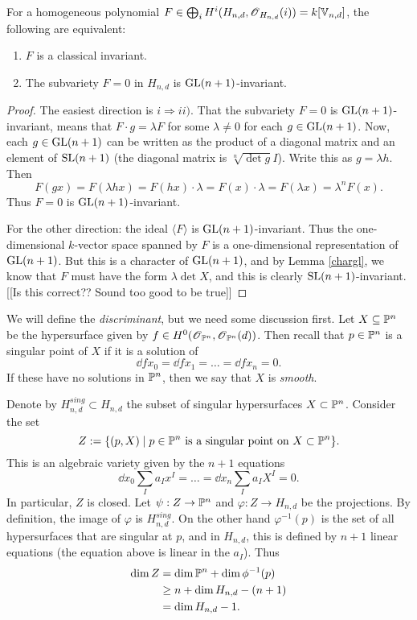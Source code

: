 \documentclass[11pt, english]{article}
\newcommand{\vnd}{\mathbb V_{n,d}}
\begin{document}
\begin{prop}
 For a homogeneous polynomial $F \in \bigoplus_i H^i(H_{n,d}, \OO_{H_{n,d}}(i))=k[\vnd]$, the following are equivalent:
 \begin{enumerate}
 \item $F$ is a classical invariant.
\item The subvariety $F = 0$ in $H_{n,d}$ is $\operatorname{GL}(n+1)$-invariant.
 \end{enumerate}
\end{prop}
\begin{proof}
The easiest direction is $i \Rightarrow ii)$. That the subvariety $F=0$ is $\operatorname{GL}(n+1)$-invariant, means that $F \cdot g = \lambda F$ for some $\lambda \neq 0$ for each $g \in \operatorname{GL}(n+1)$. Now, each $g \in \operatorname{GL}(n+1)$ can be written as the product of a diagonal matrix and an element of $\operatorname{SL}(n+1)$ (the diagonal matrix is $\sqrt[n]{\det g}I$). Write this as $g=\lambda h$. Then
\[
F(gx)=F(\lambda hx)= F(hx) \cdot \lambda = F(x) \cdot \lambda = F(\lambda x) = \lambda^n F(x).
\]
Thus $F=0$ is $\operatorname{GL}(n+1)$-invariant.

For the other direction: the ideal $\langle F \rangle$ is $\operatorname{GL}(n+1)$-invariant. Thus the one-dimensional $k$-vector space spanned by $F$ is a one-dimensional representation of $\operatorname{GL}(n+1)$. But this is a character of $\operatorname{GL}(n+1)$, and by Lemma \ref{chargl}, we know that $F$ must have the form $\lambda \det X$, and this is clearly $\operatorname{SL}(n+1)$-invariant.
[[Is this correct?? Sound too good to be true]]
\end{proof}

We will define the \emph{discriminant}, but we need some discussion first. Let $X \subseteq \mathbb{P}^n$ be the hypersurface given by $f \in H^0(\operatorname{\mathscr{O}}_{\mathbb{P}^n},\operatorname{\mathscr{O}}_{\mathbb{P}^n}(d))$. Then recall that $p \in \mathbb{P}^n$ is a singular point of $X$ if it is a solution of
\[
\dd{f}{x_0}=\dd{f}{x_1} = \ldots = \dd{f}{x_n}=0.
\]
If these have no solutions in $\mathbb{P}^n$, then we say that $X$ is \emph{smooth}.

Denote by $H_{n,d}^{sing} \subset H_{n,d}$ the subset of singular hypersurfaces $X \subset \mathbb{P}^n$. Consider the set 
\[
Z := \{ (p,X) \mid  p \in \mathbb{P}^n \text{ is a singular point on } X \subset \mathbb{P}^n \}.
\]
This is an algebraic variety given by the $n+1$ equations
\[
\dd{}{x_0} \sum_I a_I x^I = \ldots = \dd{}{x_n} \sum_I a_I X^I = 0.
\]
In particular, $Z$ is closed. Let $\psi:Z \to \mathbb{P}^n$ and $\varphi: Z \to H_{n,d}$ be the projections. By definition, the image of $\varphi$ is $H_{n,d}^{sing}$. On the other hand $\varphi^{-1}(p)$ is the set of all hypersurfaces that are singular at $p$, and in $H_{n,d}$, this is defined by $n+1$ linear equations (the equation above is linear in the $a_I$). Thus
\begin{align*}
  \dim Z &= \dim \mathbb{P}^n  + \dim \phi^{-1}(p) \\
&\geq n + \dim H_{n,d} - (n+1) \\ 
&= \dim H_{n,d} - 1.
\end{align*}
\end{document}
